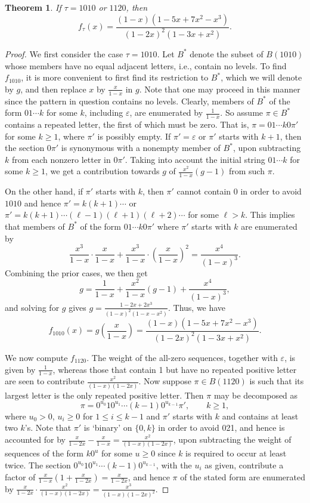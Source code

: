 \documentclass{article}
\theoremstyle{remark}
\theoremstyle{plain}
\newtheorem{theorem}{Theorem}[section]
\begin{document}
\begin{theorem}\label{1010th}
If $\tau=1010$ or $1120$, then
\begin{equation}\label{1010the1}
f_\tau(x)=\frac{(1-x)(1-5x+7x^2-x^3)}{(1-2x)^2(1-3x+x^2)}.
\end{equation}
\end{theorem}
\begin{proof}
We first consider the case $\tau=1010$.  Let $B^*$ denote the subset of $B(1010)$ whose members have no equal adjacent letters, i.e., contain no levels.  To find $f_{1010}$, it is more convenient to first find its restriction to $B^*$, which we will denote by $g$, and then replace $x$ by $\frac{x}{1-x}$ in $g$.  Note that one may proceed in this manner since the pattern in question contains no levels.  Clearly, members of $B^*$ of the form $01\cdots k$ for some $k$, including $\varepsilon$, are enumerated by $\frac{1}{1-x}$.  So assume $\pi \in B^*$ contains a repeated letter, the first of which must be zero.  That is, $\pi=01\cdots k0\pi'$ for some $k \geq 1$, where $\pi'$ is possibly empty.  If $\pi'=\varepsilon$ or $\pi'$ starts with $k+1$, then the section $0\pi'$ is synonymous with a nonempty member of $B^*$, upon subtracting $k$ from each nonzero letter in $0\pi'$.  Taking into account the initial string $01\cdots k$ for some $k \geq 1$, we get a contribution towards $g$ of $\frac{x^2}{1-x}(g-1)$ from such $\pi$.

On the other hand, if $\pi'$ starts with $k$, then $\pi'$ cannot contain 0 in order to avoid $1010$ and hence $\pi'=k(k+1)\cdots$ or $\pi'=k(k+1)\cdots(\ell-1)(\ell+1)(\ell+2)\cdots$ for some $\ell>k$. This implies that members of $B^*$ of the form $01\cdots k0\pi'$ where $\pi'$ starts with $k$ are enumerated by
$$\frac{x^3}{1-x}\cdot\frac{x}{1-x}+\frac{x^3}{1-x}\cdot\left(\frac{x}{1-x}\right)^2=\frac{x^4}{(1-x)^3}.$$
Combining the prior cases, we then get
$$g=\frac{1}{1-x}+\frac{x^2}{1-x}(g-1)+\frac{x^4}{(1-x)^3},$$
and solving for $g$ gives $g=\frac{1-2x+2x^3}{(1-x)^2(1-x-x^2)}$.
Thus, we have
$$f_{1010}(x)=g\left(\frac{x}{1-x}\right)=\frac{(1-x)(1-5x+7x^2-x^3)}{(1-2x)^2(1-3x+x^2)}.$$

We now compute $f_{1120}$.  The weight of the all-zero sequences, together with $\varepsilon$, is given by $\frac{1}{1-x}$, whereas those that contain 1 but have no repeated positive letter are seen to contribute $\frac{x^2}{(1-x)(1-2x)}$.  Now suppose $\pi \in B(1120)$ is such that its largest letter is the only repeated positive letter.  Then $\pi$ may be decomposed as
$$\pi=0^{u_0}10^{u_1}\cdots(k-1)0^{u_{k-1}}\pi', \qquad k \geq 1,$$
where $u_0>0$, $u_i\geq0$ for $1 \leq i \leq k-1$ and $\pi'$ starts with $k$ and contains at least two $k$'s.  Note that $\pi'$ is `binary' on $\{0,k\}$ in order to avoid 021, and hence is accounted for by
$\frac{x}{1-2x}-\frac{x}{1-x}=\frac{x^2}{(1-x)(1-2x)}$,
upon subtracting the weight of sequences of the form $k0^u$ for some $u\geq0$ since $k$ is required to occur at least twice.  The section $0^{u_0}10^{u_1}\cdots(k-1)0^{u_{k-1}}$, with the $u_i$ as given, contribute a factor of $\frac{x}{1-x}\left(1+\frac{x}{1-2x}\right)=\frac{x}{1-2x}$, and hence $\pi$ of the stated form are enumerated by $\frac{x}{1-2x}\cdot\frac{x^2}{(1-x)(1-2x)}=\frac{x^3}{(1-x)(1-2x)^2}$.


\end{proof}
\end{document}
